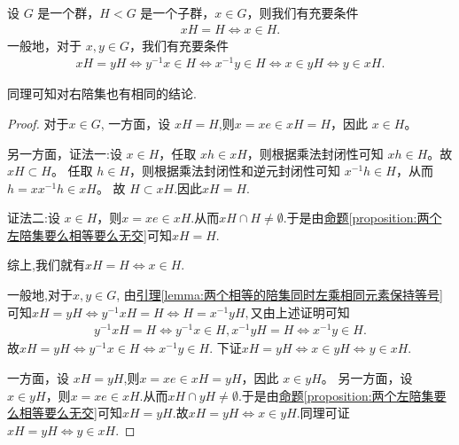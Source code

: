 \documentclass[../../main.tex]{subfiles}
\begin{document}
\begin{lemma}\label{lemma:关于两个陪集相等的充要条件}
设 \(G\) 是一个群，\(H < G\) 是一个子群，\(x \in G\)，则我们有充要条件
\begin{align*}
xH = H \iff x \in H .
\end{align*}
一般地，对于 \(x, y \in G\)，我们有充要条件
\begin{align*}
xH = yH \iff y^{-1}x \in H \iff x^{-1}y \in H \iff x\in yH \iff y\in xH.
\end{align*}
\end{lemma}
\begin{note}
同理可知对右陪集也有相同的结论.
\end{note}
\begin{proof}
对于$x\in G$,
一方面，设 \(xH = H\),则\(x = xe \in xH = H\)，因此 \(x \in H\)。

另一方面，{\color{blue}证法一:}设 \(x \in H\)，任取 \(xh \in xH\)，则根据乘法封闭性可知 \(xh \in H\)。故 \(xH \subset H\)。
任取 \(h \in H\)，则根据乘法封闭性和逆元封闭性可知 \(x^{-1}h \in H\)，从而 \(h = xx^{-1}h \in xH\)。 故 \(H \subset xH\).因此$xH=H$.

{\color{blue}证法二:}设 \(x \in H\)，则$x=xe\in xH$.从而$xH \cap H\ne \emptyset$.于是由\hyperref[proposition:两个左陪集要么相等要么无交]{命题\ref{proposition:两个左陪集要么相等要么无交}}可知$xH=H$.

综上,我们就有$xH = H \iff x \in H .$

一般地,对于$x,y\in G$,
由\hyperref[lemma:两个相等的陪集同时左乘相同元素保持等号]{引理\ref{lemma:两个相等的陪集同时左乘相同元素保持等号}}可知\(xH=yH\Leftrightarrow y^{-1}xH=H\Leftrightarrow H=x^{-1}yH,\)又由上述证明可知
\begin{align*}
y^{-1}xH=H\Longleftrightarrow y^{-1}x\in H,x^{-1}yH=H\Longleftrightarrow x^{-1}y\in H.
\end{align*}
故$xH = yH \iff y^{-1}x \in H \iff x^{-1}y \in H.$
下证$xH=yH \iff x\in yH \iff y\in xH.$

一方面，设 \(xH = yH\),则\(x = xe \in xH = yH\)，因此 \(x \in yH\)。
另一方面，设 \(x \in yH\)，则$x=xe\in xH$.从而$xH \cap yH\ne \emptyset$.于是由\hyperref[proposition:两个左陪集要么相等要么无交]{命题\ref{proposition:两个左陪集要么相等要么无交}}可知$xH=yH$.故$xH=yH \iff x\in yH$.同理可证$xH=yH \iff y\in xH$.

\end{proof}
\end{document}
